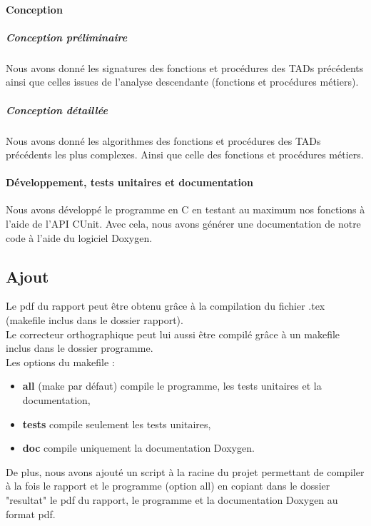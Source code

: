 \paragraph{Conception}
\subparagraph{Conception préliminaire}
Nous avons donné les signatures des fonctions et procédures des TADs précédents ainsi que celles issues de l'analyse descendante (fonctions et procédures métiers).\\

\subparagraph{Conception détaillée}
Nous avons donné les algorithmes des fonctions et procédures des TADs précédents les plus complexes. Ainsi que celle des fonctions et procédures métiers.\\

\paragraph{Développement, tests unitaires et documentation}
Nous avons développé le programme en C en testant au maximum nos fonctions à l'aide de l'API CUnit. Avec cela, nous avons générer une documentation de notre code à l'aide du logiciel Doxygen.\\

\subsection{Ajout}
Le pdf du rapport peut être obtenu grâce à la compilation du fichier .tex (makefile inclus dans le dossier rapport).\\
Le correcteur orthographique peut lui aussi être compilé grâce à un makefile inclus dans le dossier programme.\\
Les options du makefile :
\begin{itemize}
	\item \textbf{all} (make par défaut) compile le programme, les tests unitaires et la documentation,\\
	\item \textbf{tests} compile seulement les tests unitaires,\\
	\item \textbf{doc} compile uniquement la documentation Doxygen.\\
\end{itemize}
De plus, nous avons ajouté un script à la racine du projet permettant de compiler à la fois le rapport et le programme (option all) en copiant dans le dossier "resultat" le pdf du rapport, le programme et la documentation Doxygen au format pdf.\\





